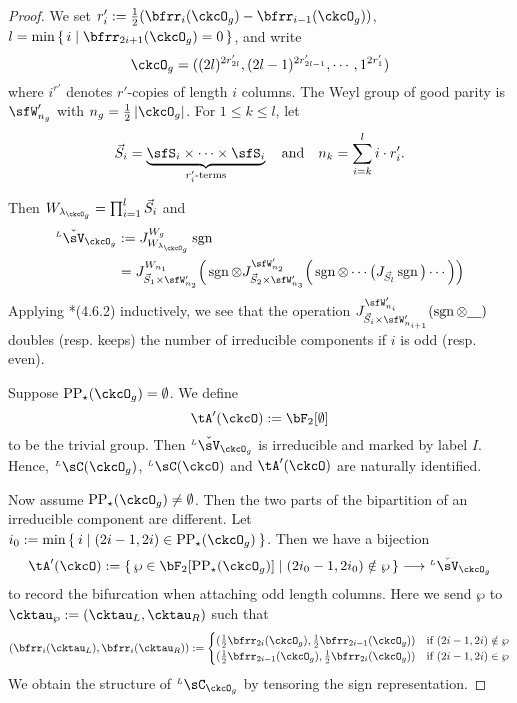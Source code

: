 \documentclass[12pt,a4paper]{amsart}
\def\abs#1{\left|{#1}\right|}
\newcommand{\sgn}{\operatorname{sgn}}
\numberwithin{equation}{section}
\theoremstyle{remark}
\def\half{{\tfrac{1}{2}}}
\def\lamckg{\lambda_{\ckcO_g}}
\def\LC{{}^{\scriptscriptstyle L}\sC}
\def\ckLV{{}^{\scriptscriptstyle L}\check\sV}
\def\Wg{W_{g}}
\def\AND{\quad \text{and} \quad}
\def\CPPs{\mathrm{PP}_{\star}}
\begin{document}
\begin{proof}
    We set $r'_{i} := \half(\bfrr_{i}(\ckcO_{g})-\bfrr_{i-1}(\ckcO_{g}))$,
    $l =\min\set{i|\bfrr_{2i+1}(\ckcO_{g})=0}$, and write
    \[
      \ckcO_{g} %
      = ((2l)^{2r'_{2l}}, (2l-1)^{2r'_{2l-1}},\cdots, 1^{2r'_{1}})
    \]
    where $i^{r'}$ denotes $r'$-copies of length $i$ columns.
    The Weyl group of good parity is $\sfW'_{n_{g}}$ with
    $n_{g} = \half\abs{\ckcO_{g}}$. For $1\leq k\leq l$, let
    \[
      \vec{S}_{i} = \underbrace{\sfS_{i}\times \cdots\times \sfS_{i}}_{r'_{i}\text{-terms}} \AND n_{k} = \sum_{i=k}^{l} i\cdot r'_{i}.
    \]

    Then $W_{\lamckg}=\prod_{i=1}^{l} \vec{S}_{i}$ and
    \[
      \begin{split}
        \ckLV_{\ckcO_{g}}& :=J_{W_{\lamckg}}^{\Wg}\sgn\\
        & = J_{\vec{S}_{1}\times \sfW'_{n_{2}}}^{W_{n_{1}}} \Big(\sgn \otimes J_{\vec{S}_{2}\times \sfW'_{n_{3}}}^{\sfW'_{n_{2}}}\Big(\sgn
        \otimes \cdots\big(J_{\vec{S}_{l}} \sgn\big)\cdots \Big)\Big) \\
      \end{split}
    \]
    Applying \cite{Lu}*{(4.6.2)} inductively, we see that the operation
    $J_{\vec{S}_{i}\times \sfW'_{n_{i+1}}}^{\sfW'_{n_{i}}}(\sgn \otimes \underline{\ \ \ })$
    doubles (resp. keeps) the number of irreducible components if $i$ is odd
    (resp. even).

    Suppose $\CPPs(\ckcO_{g}) = \emptyset$.
    We define
    \[
      \tA'(\ckcO):= \bF_{2}[\emptyset]
    \]
    to be the trivial group.
    Then $\ckLV_{\ckcO_{g}}$ is
    irreducible and marked by label $I$.  Hence, $\LC(\ckcO_{g})$,
    $\LC(\ckcO)$ and $\tA'(\ckcO)$ are naturally identified.


    Now assume $\CPPs(\ckcO_{g})\neq \emptyset$. Then the two parts of the
    bipartition of an irreducible component are different. Let
    $i_{0}:= \min\Set{i| (2i-1,2i)\in \CPPs(\ckcO_{g})}$.
    Then we have a bijection
    \[
      \tA'(\ckcO):= \set{\wp\in \bF_{2}[\CPPs(\ckcO_{g})]|(2i_{0}-1,2i_{0})\notin \wp} \longrightarrow \ckLV_{\ckcO_{g}}
    \]
    to record the bifurcation when attaching odd length columns. Here we send
    $\wp$ to $\cktau_{\wp}:= (\cktau_{L},\cktau_{R})$ such that
    \[
      (\bfrr_{i}(\cktau_{L}),\bfrr_{i}(\cktau_{R})) := \begin{cases} (\half\bfrr_{2i}(\ckcO_{g}),\half\bfrr_{2i-1}(\ckcO_{g}))
        & \text{if } (2i-1,2i)\notin \wp\\
        (\half\bfrr_{2i-1}(\ckcO_{g}),\half\bfrr_{2i}(\ckcO_{g}))
        & \text{if } (2i-1,2i)\in \wp\\
      \end{cases}
    \]
    We obtain the structure of $\LC_{\ckcO_{g}}$ by tensoring the sign
    representation.


\end{proof}
\end{document}
